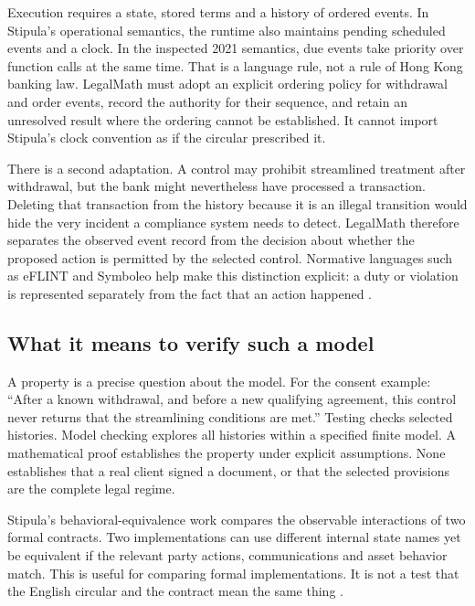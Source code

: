Execution requires a state, stored terms and a history of ordered events. In
Stipula's operational semantics, the runtime also maintains pending scheduled
events and a clock. In the inspected 2021 semantics, due events take priority
over function calls at the same time. That is a language rule, not a rule of
Hong Kong banking law. LegalMath must adopt an explicit ordering policy for
withdrawal and order events, record the authority for their sequence, and retain
an unresolved result where the ordering cannot be established. It cannot import
Stipula's clock convention as if the circular prescribed it.

There is a second adaptation. A control may prohibit streamlined treatment after
withdrawal, but the bank might nevertheless have processed a transaction.
Deleting that transaction from the history because it is an illegal transition
would hide the very incident a compliance system needs to detect. LegalMath
therefore separates the observed event record from the decision about whether
the proposed action is permitted by the selected control. Normative languages
such as eFLINT and Symboleo help make this distinction explicit: a duty or
violation is represented separately from the fact that an action happened
\citep{eflint2020,symboleo2020}.

\subsection{What it means to verify such a model}

A property is a precise question about the model. For the consent example:
``After a known withdrawal, and before a new qualifying agreement, this control
never returns that the streamlining conditions are met.'' Testing checks selected
histories. Model checking explores all histories within a specified finite
model. A mathematical proof establishes the property under explicit assumptions.
None establishes that a real client signed a document, or that the selected
provisions are the complete legal regime.

Stipula's behavioral-equivalence work compares the observable interactions of
two formal contracts. Two implementations can use different internal state names
yet be equivalent if the relevant party actions, communications and asset
behavior match. This is useful for comparing formal implementations. It is not
a test that the English circular and the contract mean the same thing
\citep[sec.~5]{stipula2021}.

